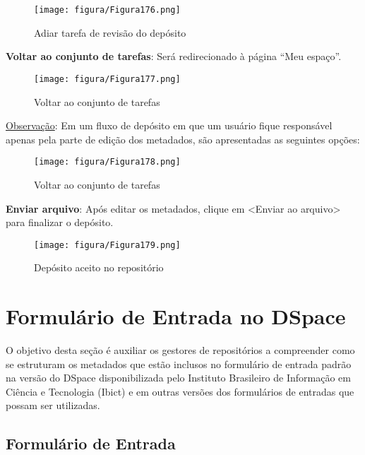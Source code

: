 \documentclass[12pt,hidelinks]{article}
\begin{document}
    \begin{figure}[!htp]
                \centering
                \texttt{[image: figura/Figura176.png]}
                \caption{Adiar tarefa de revisão do depósito}
            \label{Rotulo}
        \end{figure}
    
    \textbf{Voltar ao conjunto de tarefas}: Será redirecionado à página “Meu espaço”.
    
    \begin{figure}[!htp]
                \centering
                \texttt{[image: figura/Figura177.png]}
                \caption{Voltar ao conjunto de tarefas}
            \label{Rotulo}
        \end{figure}
    
    \underline{Observação}: Em um fluxo de depósito em que um usuário fique responsável apenas pela parte de edição dos metadados, são apresentadas as seguintes opções: 
    
    \begin{figure}[!htp]
                \centering
                \texttt{[image: figura/Figura178.png]}
                \caption{Voltar ao conjunto de tarefas}
            \label{Rotulo}
        \end{figure}
    
    \textbf{Enviar arquivo}: Após editar os metadados, clique em <Enviar ao arquivo> para finalizar o depósito.
    
    \begin{figure}[!htp]
                \centering
                \texttt{[image: figura/Figura179.png]}
                \caption{Depósito aceito no repositório}
            \label{Rotulo}
        \end{figure}
    
\newpage
\section{Formulário de Entrada no DSpace}
\newpage
    
    O objetivo desta seção é auxiliar os gestores de repositórios a compreender como se estruturam os metadados que estão inclusos no formulário de entrada padrão na versão do DSpace disponibilizada pelo Instituto Brasileiro de Informação em Ciência e Tecnologia (Ibict) e em outras versões dos formulários de entradas que possam ser utilizadas.
    
    \subsection{Formulário de Entrada}
    
\end{document}
